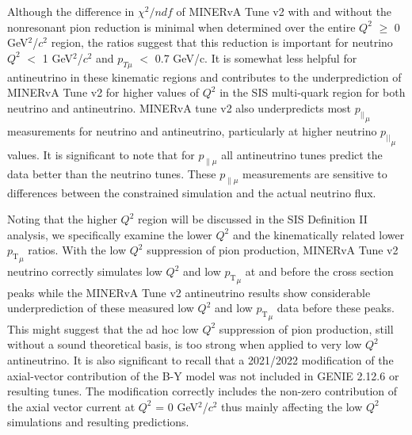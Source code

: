 \documentclass[aps, prd, twocolumn, showpacs, superscriptaddress, floatfix]{revtex4-2}
\begin{document}
Although the difference in $\chi^2/ndf$ of MINERvA Tune v2  with and without the nonresonant pion reduction is minimal when determined over the entire $Q^2$ $\geq$ 0 GeV$^2$/$c^2$ region, the ratios suggest that this reduction is important for neutrino $Q^2$ $<$ 1 GeV$^2$/$c^2$ and $p_{T\mu}$ $<$ 0.7 GeV/c. It is somewhat less helpful for antineutrino in these kinematic regions and contributes to the underprediction of MINERvA Tune v2 for higher values of $Q^2$ in the SIS multi-quark region for both neutrino and antineutrino. MINERvA tune v2 also underpredicts most ${p_{||}}_\mu$ measurements for neutrino and antineutrino, particularly at higher neutrino ${p_{||}}_\mu$ values. It is significant to note that for $p_{\parallel\mu}$ all antineutrino tunes predict the data better than the neutrino tunes. These $p_{\parallel\mu}$ measurements are sensitive to differences between the constrained simulation and the actual neutrino flux. 

Noting that the higher $Q^2$ region will be discussed in the SIS Definition II analysis, we specifically examine the lower $Q^2$ and the kinematically related lower ${p_\mathrm{T}}_\mu$ ratios. With the low $Q^2$ suppression of pion production, MINERvA Tune v2 neutrino correctly simulates low $Q^2$ and low ${p_\mathrm{T}}_\mu$ at and before the cross section peaks while the MINERvA Tune v2 antineutrino results show considerable underprediction of these measured low $Q^2$ and low ${p_\mathrm{T}}_\mu$ data before these peaks. This might suggest that the ad hoc low $Q^2$ suppression of pion production, still without a sound theoretical basis, is too strong when applied to very low $Q^2$ antineutrino. It is also significant to recall that a 2021/2022 modification of the axial-vector contribution of the B-Y \cite{Bodek:2021bde} model was not included in GENIE 2.12.6 or resulting tunes. The modification correctly includes the non-zero contribution of the axial vector current at $Q^2$ = 0 GeV$^2$/$c^2$ thus mainly affecting the low $Q^2$ simulations and resulting predictions.
\end{document}
